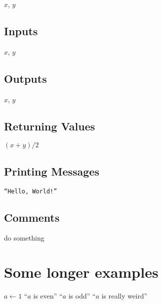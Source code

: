 \documentclass{amsart}
\begin{document}
\begin{algorithmic}[1]
    \GLOBALS $x$, $y$
\end{algorithmic}

\subsection{Inputs}

\begin{algorithmic}[1]
    \INPUTS
        \STATE $x$, $y$
    \ENDINPUTS
\end{algorithmic}

\subsection{Outputs}

\begin{algorithmic}[1]
    \OUTPUTS
        \STATE $x$, $y$
    \ENDOUTPUTS
\end{algorithmic}

\subsection{Returning Values}

\begin{algorithmic}[1]
\RETURN $(x+y)/2$
\end{algorithmic}

\subsection{Printing Messages}

\begin{algorithmic}[1]
\PRINT \texttt{``Hello, World!''}
\end{algorithmic}

\subsection{Comments}

\begin{algorithmic}[1]
\STATE do something 
\end{algorithmic}

\section{Some longer examples}

\begin{algorithmic}
    \STATE $a \leftarrow 1$
        \PRINT ``$a$ is even''
        \PRINT ``$a$ is odd''
    \ELSE
        \PRINT ``$a$ is really weird''
    \ENDIF
\end{algorithmic}
\end{document}
